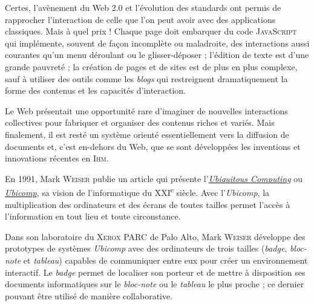 Certes, l’avènement du Web 2.0 et l’évolution des standards ont permis de rapprocher l’interaction de celle que l’on peut avoir avec des applications classiques. Mais à quel prix ! Chaque page doit embarquer du code \textsc{JavaScript} qui implémente, souvent de façon incomplète ou maladroite, des interactions aussi courantes qu’un menu déroulant ou le glisser-déposer ; l’édition de texte est d’une grande pauvreté ; la création de pages et de sites est de plus en plus complexe, sauf à utiliser des outils comme les \textit{blogs} qui restreignent dramatiquement la forme des contenus et les capacités d’interaction.

Le Web présentait une opportunité rare d’imaginer de nouvelles interactions collectives pour fabriquer et organiser des contenus riches et variés. Mais finalement, il est resté un système orienté essentiellement vers la diffusion de documents et, c’est en-dehors du Web, que se sont développées les inventions et innovations récentes en \textsc{Ihm}.




En 1991, Mark \textsc{Weiser} publie un article qui présente l'\href{https://en.wikipedia.org/wiki/Ubiquitous_computing}{\textit{Ubiquitous Computing}} ou \href{https://fr.wikipedia.org/wiki/Informatique_ubiquitaire}{\textit{Ubicomp}}, sa vision de l'informatique du XXI\textsuperscript{e} siècle. Avec l'\textit{Ubicomp}, la multiplication des ordinateurs et des écrans de toutes tailles permet l'accès à l'information en tout lieu et toute circonstance.

Dans son laboratoire du \textsc{Xerox PARC} de Palo Alto, Mark \textsc{Weiser} développe des prototypes de systèmes \textit{Ubicomp} avec des ordinateurs de trois tailles (\textit{badge}, \textit{bloc-note} et \textit{tableau}) capables de communiquer entre eux pour créer un environnement interactif. Le \textit{badge} permet de localiser son porteur et de mettre à disposition ses documents informatiques sur le \textit{bloc-note} ou le \textit{tableau} le plus proche ; ce dernier pouvant être utilisé de manière collaborative.

